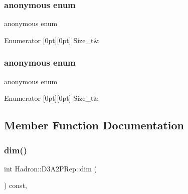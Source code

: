 \subsubsection{\texorpdfstring{anonymous enum}{anonymous enum}}
{\footnotesize\ttfamily anonymous enum}

\begin{DoxyEnumFields}{Enumerator}
[0pt][0pt]{}\mbox{\label{structHadron_1_1D3A2PRep_ab1d71825d3cea93490c1754d0e5b412ea8bb13fdc1f05d38c1ee8f3ebe3a76b23}} 
Size\+\_\+t&\\
\hline

\end{DoxyEnumFields}
\mbox{\label{structHadron_1_1D3A2PRep_ab1d71825d3cea93490c1754d0e5b412e}} 
\subsubsection{\texorpdfstring{anonymous enum}{anonymous enum}}
{\footnotesize\ttfamily anonymous enum}

\begin{DoxyEnumFields}{Enumerator}
[0pt][0pt]{}\mbox{\label{structHadron_1_1D3A2PRep_ab1d71825d3cea93490c1754d0e5b412ea8bb13fdc1f05d38c1ee8f3ebe3a76b23}} 
Size\+\_\+t&\\
\hline

\end{DoxyEnumFields}


\subsection{Member Function Documentation}
\mbox{\label{structHadron_1_1D3A2PRep_a0cd24db04dc4889f2a1014f97efb41fc}} 
\subsubsection{\texorpdfstring{dim()}{dim()}\hspace{0.1cm}{\footnotesize\ttfamily [1/2]}}
{\footnotesize\ttfamily int Hadron\+::\+D3\+A2\+P\+Rep\+::dim (\begin{DoxyParamCaption}{ }\end{DoxyParamCaption}) const\hspace{0.3cm}{\ttfamily [inline]}, {\ttfamily [virtual]}}

